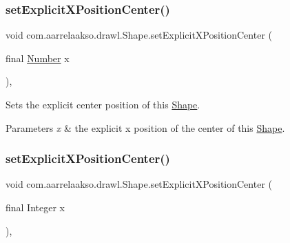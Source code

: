 \subsubsection{\texorpdfstring{set\+Explicit\+X\+Position\+Center()}{setExplicitXPositionCenter()}\hspace{0.1cm}{\footnotesize\ttfamily [1/2]}}
{\footnotesize\ttfamily void com.\+aarrelaakso.\+drawl.\+Shape.\+set\+Explicit\+X\+Position\+Center (\begin{DoxyParamCaption}\item[{final \hyperlink{interfacecom_1_1aarrelaakso_1_1drawl_1_1_number}{Number}}]{x }\end{DoxyParamCaption})\hspace{0.3cm}{\ttfamily [protected]}, {\ttfamily [inherited]}}



Sets the explicit center position of this \hyperlink{classcom_1_1aarrelaakso_1_1drawl_1_1_shape}{Shape}. 


\begin{DoxyParams}{Parameters}
{\em x} & the explicit x position of the center of this \hyperlink{classcom_1_1aarrelaakso_1_1drawl_1_1_shape}{Shape}. \\
\hline
\end{DoxyParams}
\mbox{\label{classcom_1_1aarrelaakso_1_1drawl_1_1_shape_a271cd9377952616a30a434b22e22000a}} 
\subsubsection{\texorpdfstring{set\+Explicit\+X\+Position\+Center()}{setExplicitXPositionCenter()}\hspace{0.1cm}{\footnotesize\ttfamily [2/2]}}
{\footnotesize\ttfamily void com.\+aarrelaakso.\+drawl.\+Shape.\+set\+Explicit\+X\+Position\+Center (\begin{DoxyParamCaption}\item[{final Integer}]{x }\end{DoxyParamCaption})\hspace{0.3cm}{\ttfamily [protected]}, {\ttfamily [inherited]}}



